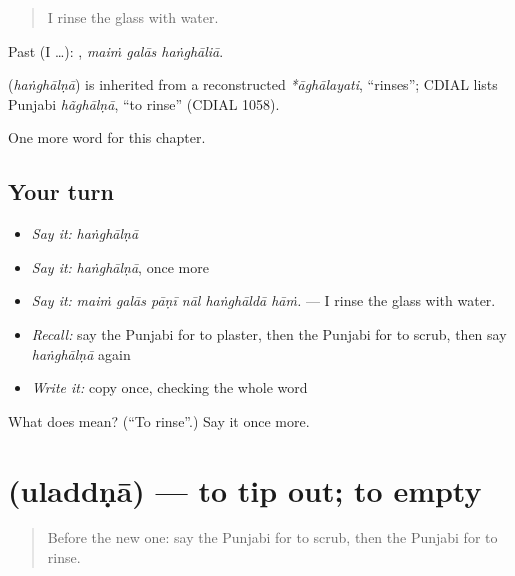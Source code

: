 \begin{quote}
I rinse the glass with water.
\end{quote}

Past (I …):   , \emph{maiṁ galās haṅghāliā}.

\begin{cousinweb}
\textbf{} (\emph{haṅghālṇā}) is inherited from a reconstructed \emph{*āghālayati}, \textquotedblleft{}rinses\textquotedblright{}; CDIAL lists Punjabi \emph{hãghālṇā}, \textquotedblleft{}to rinse\textquotedblright{} (CDIAL 1058).
\end{cousinweb}

\begin{grammarlens}[title={What you've built}]
One more word for this chapter.
\end{grammarlens}

\subsection*{Your turn}
\begin{itemize}
\raggedright
  \item \emph{Say it:} \emph{haṅghālṇā}
  \item \emph{Say it:} \emph{haṅghālṇā}, once more
  \item \emph{Say it:} \emph{maiṁ galās pāṇī nāl haṅghāldā hāṁ.} — I rinse the glass with water.
  \item \emph{Recall:} say the Punjabi for to plaster, then the Punjabi for to scrub, then say \emph{haṅghālṇā} again
  \item \emph{Write it:} copy \textbf{} once, checking the whole word
\end{itemize}

\begin{tcolorbox}[breakable,colback=teal!4,colframe=teal!35!black,title={Before you move on}]
What does  mean? (\textquotedblleft{}To rinse\textquotedblright{}.) Say it once more.
\end{tcolorbox}
\section[\texorpdfstring{\pa{ਉਲੱਦਣਾ} (uladdṇā)}{ਉਲੱਦਣਾ (uladdṇā)}]{ (uladdṇā) — to tip out; to empty}

\label{lesson:PA-C236-uladdna}



\begin{quote}
Before the new one: say the Punjabi for to scrub, then the Punjabi for to rinse.
\end{quote}


